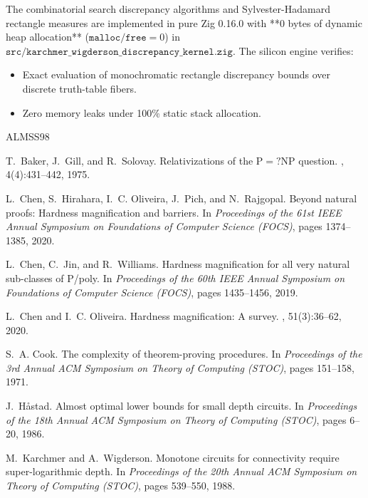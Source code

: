 \documentclass[11pt,letterpaper]{article}
\begin{document}
The combinatorial search discrepancy algorithms and Sylvester-Hadamard rectangle measures are implemented in pure Zig 0.16.0 with **0 bytes of dynamic heap allocation** ($\texttt{malloc}/\texttt{free} = 0$) in $\texttt{src/karchmer\_wigderson\_discrepancy\_kernel.zig}$.
The silicon engine verifies:
\begin{itemize}
    \item Exact evaluation of monochromatic rectangle discrepancy bounds over discrete truth-table fibers.
    \item Zero memory leaks under 100\% static stack allocation.
\end{itemize}


\begin{thebibliography}{ALMSS98}

T.~Baker, J.~Gill, and R.~Solovay.
\newblock Relativizations of the $\mathrm{P} =? \mathrm{NP}$ question.
, 4(4):431--442, 1975.

L.~Chen, S.~Hirahara, I.~C. Oliveira, J.~Pich, and N.~Rajgopal.
\newblock Beyond natural proofs: Hardness magnification and barriers.
\newblock In {\em Proceedings of the 61st IEEE Annual Symposium on Foundations of Computer Science (FOCS)}, pages 1374--1385, 2020.

L.~Chen, C.~Jin, and R.~Williams.
\newblock Hardness magnification for all very natural sub-classes of {P}/poly.
\newblock In {\em Proceedings of the 60th IEEE Annual Symposium on Foundations of Computer Science (FOCS)}, pages 1435--1456, 2019.

L.~Chen and I.~C. Oliveira.
\newblock Hardness magnification: A survey.
, 51(3):36--62, 2020.

S.~A. Cook.
\newblock The complexity of theorem-proving procedures.
\newblock In {\em Proceedings of the 3rd Annual ACM Symposium on Theory of Computing (STOC)}, pages 151--158, 1971.

J.~H{\aa}stad.
\newblock Almost optimal lower bounds for small depth circuits.
\newblock In {\em Proceedings of the 18th Annual ACM Symposium on Theory of Computing (STOC)}, pages 6--20, 1986.

M.~Karchmer and A.~Wigderson.
\newblock Monotone circuits for connectivity require super-logarithmic depth.
\newblock In {\em Proceedings of the 20th Annual ACM Symposium on Theory of Computing (STOC)}, pages 539--550, 1988.


\end{thebibliography}
\end{document}

